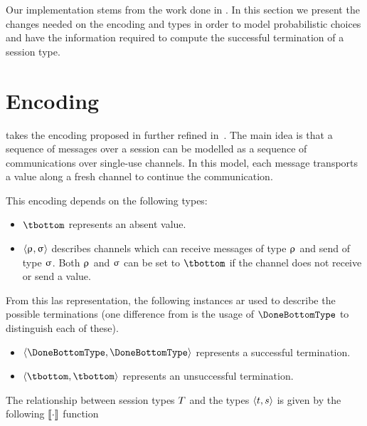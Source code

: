 Our implementation stems from the work done in \FuSe. In this section we present
the changes needed on the encoding and types in order to model probabilistic
choices and have the information required to compute the successful termination
of a session type.

\section{Encoding}

\FuSe takes the encoding proposed in \cite{Dardha} further refined
in~\cite{DBLP:journals/jfp/Padovani17}. The main idea is that a sequence of
messages over a session can be modelled as a sequence of communications over
single-use channels. In this model, each message transports a value along a
fresh channel to continue the communication.

This encoding depends on the following types:

\begin{itemize}
	\item $\tbottom$ represents an absent value.
	\item $\langle\uprho_{},\upsigma_{}\rangle$ describes channels which can
		receive messages of type $\uprho_{}$ and send of type $\upsigma_{}$. Both
		$\uprho_{}$ and $\upsigma_{}$ can be set to $\tbottom$ if the channel does not
		receive or send a value.
\end{itemize}

From this las representation, the following instances ar used to describe the
possible terminations (one difference from \FuSe is the usage of
$\DoneBottomType$ to distinguish each of these).

\begin{itemize}
	\item $\tsession{\DoneBottomType}{\DoneBottomType}$ represents a successful
	termination.
	\item $\tsession{\tbottom}{\tbottom}$ represents an unsuccessful
	termination.
\end{itemize}

The relationship between session types $T$ and the types
$\langle t,s\rangle$ is given by the following $\llbracket\cdot\rrbracket$ function

